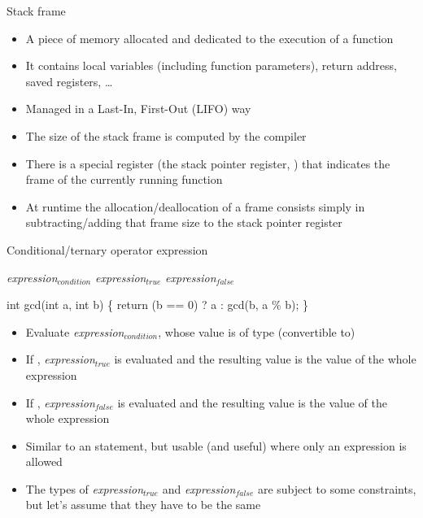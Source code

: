 \begin{frame}{Stack frame}

  \begin{itemize}[<+->]
  \item A piece of memory allocated and dedicated to the execution of a function
  \item It contains local variables (including function parameters), return
    address, saved registers, \ldots
  \item Managed in a Last-In, First-Out (LIFO) way
  \item The size of the stack frame is computed by the compiler
  \item There is a special register (the stack pointer register, )
    that indicates the frame of the currently running function
  \item At runtime the allocation/deallocation of a frame consists simply in
    subtracting/adding that frame size to the stack pointer register
  \end{itemize}
\end{frame}

\begin{frame}[fragile]{Conditional/ternary operator expression}

  \begin{center}
    \textit{expression}$_{condition}$  \textit{expression}$_{true}$ \code{:} \textit{expression}$_{false}$
  \end{center}

  \begin{codeblock}
int gcd(int a, int b)
\{
  return (b == 0) \alert{?} a \alert{:} gcd(b, a \% b);
\}\end{codeblock}

  \begin{itemize}
  \item Evaluate \textit{expression}$_{condition}$, whose value is of type
    (convertible to) 
  \item If , \textit{expression}$_{true}$ is evaluated and the
    resulting value is the value of the whole expression
  \item If , \textit{expression}$_{false}$ is evaluated and the
    resulting value is the value of the whole expression
  \end{itemize}

  \begin{itemize}
  \item Similar to an  statement, but usable (and useful) where only an
    expression is allowed
  \item The types of \textit{expression}$_{true}$ and
    \textit{expression}$_{false}$ are subject to some constraints, but let's
    assume that they have to be the same
  \end{itemize}

\end{frame}

